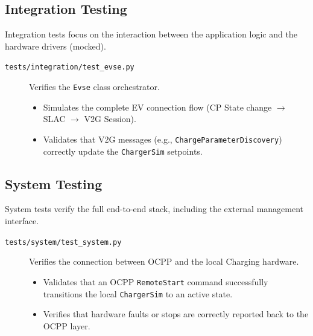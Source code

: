 \documentclass[a4paper,11pt]{report}
\begin{document}
\subsection{Integration Testing}
Integration tests focus on the interaction between the application logic and the hardware drivers (mocked).
\begin{description}
    \item[\texttt{tests/integration/test\_evse.py}] Verifies the \texttt{Evse} class orchestrator.
    \begin{itemize}
        \item Simulates the complete EV connection flow (CP State change $\rightarrow$ SLAC $\rightarrow$ V2G Session).
        \item Validates that V2G messages (e.g., \texttt{ChargeParameterDiscovery}) correctly update the \texttt{ChargerSim} setpoints.
    \end{itemize}
\end{description}

\subsection{System Testing}
System tests verify the full end-to-end stack, including the external management interface.
\begin{description}
    \item[\texttt{tests/system/test\_system.py}] Verifies the connection between OCPP and the local Charging hardware.
    \begin{itemize}
        \item Validates that an OCPP \texttt{RemoteStart} command successfully transitions the local \texttt{ChargerSim} to an active state.
        \item Verifies that hardware faults or stops are correctly reported back to the OCPP layer.
    \end{itemize}
\end{description}
\end{document}
